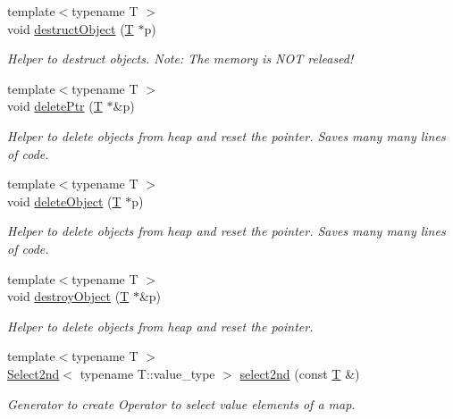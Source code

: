 \begin{DoxyCompactItemize}
{\footnotesize template$<$typename T $>$ }\\void \hyperlink{namespace_d_d4hep_ade831af9bcee15f0635c098a5c1a9da4}{destructObject} (\hyperlink{class_t}{T} $\ast$p)
\begin{DoxyCompactList}\small\item\em Helper to destruct objects. Note: The memory is NOT released! \item\end{DoxyCompactList}\item 
{\footnotesize template$<$typename T $>$ }\\void \hyperlink{namespace_d_d4hep_a2f88a88693a607df41aec66ad3b4ddf5}{deletePtr} (\hyperlink{class_t}{T} $\ast$\&p)
\begin{DoxyCompactList}\small\item\em Helper to delete objects from heap and reset the pointer. Saves many many lines of code. \item\end{DoxyCompactList}\item 
{\footnotesize template$<$typename T $>$ }\\void \hyperlink{namespace_d_d4hep_ab0f75632f10a3b7d64ed63ebea03c7a7}{deleteObject} (\hyperlink{class_t}{T} $\ast$p)
\begin{DoxyCompactList}\small\item\em Helper to delete objects from heap and reset the pointer. Saves many many lines of code. \item\end{DoxyCompactList}\item 
{\footnotesize template$<$typename T $>$ }\\void \hyperlink{namespace_d_d4hep_af0262338b8839e71107ce4303ccf4ee3}{destroyObject} (\hyperlink{class_t}{T} $\ast$\&p)
\begin{DoxyCompactList}\small\item\em Helper to delete objects from heap and reset the pointer. \item\end{DoxyCompactList}\item 
{\footnotesize template$<$typename T $>$ }\\\hyperlink{class_d_d4hep_1_1_select2nd}{Select2nd}$<$ typename T::value\_\-type $>$ \hyperlink{namespace_d_d4hep_aa8249774a9afc934f855373b93480203}{select2nd} (const \hyperlink{class_t}{T} \&)
\begin{DoxyCompactList}\small\item\em Generator to create Operator to select value elements of a map. \item\end{DoxyCompactList}\item 

\end{DoxyCompactItemize}
